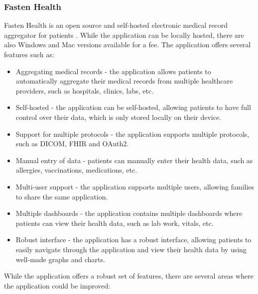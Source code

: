 \subsubsection{Fasten Health}

Fasten Health is an open source and self-hosted electronic medical record aggregator for patients \parencite{fasten}. While the application can be locally hosted, there are also Windows and Mac versions available for a fee. The application offers several features such as:

\begin{itemize}
    \item Aggregating medical records - the application allows patients to automatically aggregate their medical records from multiple healthcare providers, such as hospitals, clinics, labs, etc.
    \item Self-hosted - the application can be self-hosted, allowing patients to have full control over their data, which is only stored locally on their device.
    \item Support for multiple protocols - the application supports multiple protocols, such as DICOM, FHIR and OAuth2.
    \item Manual entry of data - patients can manually enter their health data, such as allergies, vaccinations, medications, etc.
    \item Multi-user support - the application supports multiple users, allowing families to share the same application.
    \item Multiple dashboards - the application contains multiple dashboards where patients can view their health data, such as lab work, vitals, etc.
    \item Robust interface - the application has a robust interface, allowing patients to easily navigate through the application and view their health data by using well-made graphs and charts.
\end{itemize}

While the application offers a robust set of features, there are several areas where the application could be improved:

